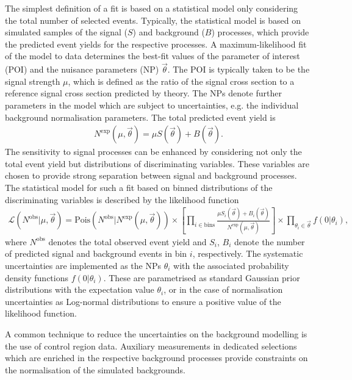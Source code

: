 The simplest definition of a fit is based on a statistical model only considering the total number of selected events. Typically, the statistical model is based on simulated samples of the signal (\(S\)) and background (\(B\)) processes, which provide the predicted event yields for the respective processes.
A maximum-likelihood fit of the model to data determines the best-fit values of the parameter of interest (POI) and the nuisance parameters (NP) \(\vec{\theta}\). The POI is typically taken to be the signal strength \(\mu\), which is defined as the ratio of the signal cross section to a reference signal cross section predicted by theory. The NPs denote further parameters in the model which are subject to uncertainties, e.g. the individual background normalisation parameters.
The total predicted event yield is
\begin{align}
    N^{\text{exp}} (\mu, \vec{\theta}) = \mu S(\vec{\theta}) + B(\vec{\theta}).
\end{align}
The sensitivity to signal processes can be enhanced by considering not only the total event yield but distributions of discriminating variables. These variables are chosen to provide strong separation between signal and background processes. The statistical model for such a fit based on binned distributions of the discriminating variables is described by the likelihood function
\begin{align}
	\mathcal{L}(N^{\text{obs}} | \mu, \vec{\theta}) = %
	\text{Pois}(N^{\text{obs}} | N^{\text{exp}} (\mu, \vec{\theta})) %
	\times \left[ %
		\prod_{i \in \text{bins}} \frac{\mu S_i(\vec{\theta}) + B_i(\vec{\theta})}{N^{\text{exp}} (\mu, \vec{\theta})}
	\right] %
	\times \prod_{\theta_{i} \in \vec{\theta}} f(0 | \theta_{i}),
	\label{eq:methods:statistics:likelihood}
\end{align}
where \(N^{\text{obs}}\) denotes the total observed event yield and \(S_{i}\), \(B_{i}\) denote the number of predicted signal and background events in bin \(i\), respectively.
The systematic uncertainties are implemented as the NPs \(\theta_{i}\) with the associated probability density functions \(f(0|\theta_{i})\).
These are parametrised as standard Gaussian prior distributions with the expectation value \(\theta_{i}\), or in the case of normalisation uncertainties as Log-normal distributions to ensure a positive value of the likelihood function.

A common technique to reduce the uncertainties on the background modelling is the use of control region data.
Auxiliary measurements in dedicated selections which are enriched in the respective background processes provide constraints on the normalisation of the simulated backgrounds.

